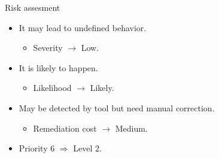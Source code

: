 \begin{frame}[t]{Risk assesment}
\begin{itemize}
  \item It may lead to undefined behavior.
    \begin{itemize}
      \item Severity $\rightarrow$ Low.
    \end{itemize}

  \vfill
  \item It is likely to happen.
    \begin{itemize}
      \item Likelihood $\rightarrow$ Likely.
    \end{itemize}

  \vfill
  \item May be detected by tool but need manual correction.
    \begin{itemize}
      \item Remediation cost $\rightarrow$ Medium.
    \end{itemize}

  \vfill
  \item Priority 6 $\Rightarrow$ Level 2.
\end{itemize}
\end{frame}
